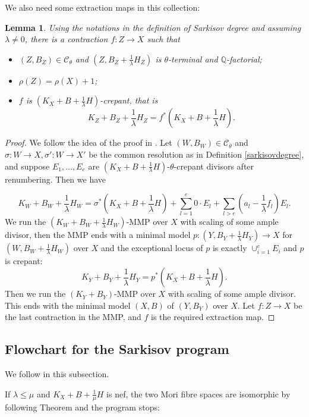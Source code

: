 \documentclass[11pt]{amsart}
\newtheorem{lem}[defn]{Lemma}
\begin{document}
We also need some  extraction maps in this collection:
\begin{lem}\label{thetaextraction}
  Using the notations in the definition of Sarkisov degree and assuming $\lambda \neq 0$, there is a contraction  $f: Z\to X$ such that
  \begin{itemize}
    \item $(Z,B_{Z})\in \mathcal{C}_{\theta}$ and $(Z,B_{Z}+\frac{1}{\lambda}H_{Z})$ is $\theta$-terminal and $\mathbb{Q}$-factorial;
    \item  $\rho(Z)=\rho(X)+1$;
    \item $f$ is $(K_{X}+B+\frac{1}{\lambda}H)$-crepant, that is
          \[
            K_{Z}+B_{Z}+\frac{1}{\lambda}H_{Z}=f^*(K_{X}+B+\frac{1}{\lambda}H)
            .\]
  \end{itemize}
\end{lem}
\begin{proof}
  We follow the idea of the proof in \cite[Proposition 1.6]{brunoLogSarkisovProgram1995}.  Let $(W,B_{W})\in \mathcal{C}_{\theta}$ and $\sigma:W\to X,\sigma':W \to X'$ be the common resolution as in Definition \ref{sarkisovdegree}, and suppose  $E_{1},\ldots ,E_{e}$ are   $(K_{X}+B+\frac{1}{\lambda}H)$-$\theta$-crepant divisors after renumbering. Then we have

  \[ K_W+B_W+\frac{1}{\lambda} H_W=\sigma^*(K_X+B+\frac{1}{\lambda} H)+\sum_{l=1}^{e} 0\cdot E_{l}+\sum_{l>e}(a_l-\frac{1}{\lambda} f_l)E_l .\]
  We run the $(K_{W}+B_{W}+\frac{1}{\lambda}H_{W})$-MMP over $X$ with scaling of some ample divisor, then the MMP ends with a minimal model $p:(Y, B_{Y}+\frac{1}{\lambda}H_{Y})\to X$  for $(W, B_{W}+\frac{1}{\lambda}H_{W})$ over $X$ and the exceptional locus of $p$ is exactly $\cup_{i=1}^{e}E_{i}$ and $p$ is crepant:
  \[
    K_{Y}+B_{Y}+\frac{1}{\lambda}H_{Y}=p^*(K_{X}+B+\frac{1}{\lambda}H)
    .\]
  Then we run the $(K_{Y}+B_{Y})$-MMP over $X$ with scaling of some ample divisor. This ends with the minimal model  $(X,B)$ of $(Y,B_{Y})$ over $X$. Let $f: Z\to X$ be the last contraction in the MMP, and $f$ is the required extraction map.
\end{proof}
\subsection{Flowchart for the Sarkisov program}
We follow \cite[\S1]{brunoLogSarkisovProgram1995} in this subsection.

If $ \lambda\leqslant\mu $ and $ K_X+B+\frac{1}{\mu}H $ is nef, the two Mori fibre spaces are isomorphic by following Theorem and the program stops:
\end{document}
